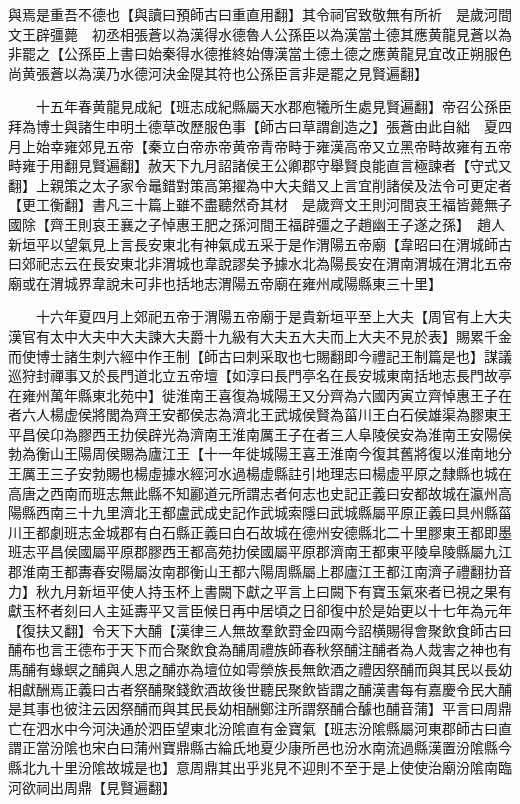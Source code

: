 與焉是重吾不德也【與讀曰預師古曰重直用翻】其令祠官致敬無有所祈　是歲河間文王辟彊薨　初丞相張蒼以為漢得水德魯人公孫臣以為漢當土德其應黄龍見蒼以為非罷之【公孫臣上書曰始秦得水德推終始傳漢當土德土德之應黄龍見宜改正朔服色尚黄張蒼以為漢乃水德河決金隄其符也公孫臣言非是罷之見賢遍翻】

　　十五年春黄龍見成紀【班志成紀縣屬天水郡庖犧所生處見賢遍翻】帝召公孫臣拜為博士與諸生申明土德草改歷服色事【師古曰草謂創造之】張蒼由此自絀　夏四月上始幸雍郊見五帝【秦立白帝赤帝黄帝青帝畤于雍漢高帝又立黑帝畤故雍有五帝畤雍于用翻見賢遍翻】赦天下九月詔諸侯王公卿郡守舉賢良能直言極諫者【守式又翻】上親策之太子家令鼂錯對策高第擢為中大夫錯又上言宜削諸侯及法令可更定者【更工衡翻】書凡三十篇上雖不盡聽然奇其材　是歲齊文王則河間哀王福皆薨無子國除【齊王則哀王襄之子悼惠王肥之孫河間王福辟彊之子趙幽王子遂之孫】　趙人新垣平以望氣見上言長安東北有神氣成五采于是作渭陽五帝廟【韋昭曰在渭城師古曰郊祀志云在長安東北非渭城也韋說謬矣予據水北為陽長安在渭南渭城在渭北五帝廟或在渭城界韋說未可非也括地志渭陽五帝廟在雍州咸陽縣東三十里】

　　十六年夏四月上郊祀五帝于渭陽五帝廟于是貴新垣平至上大夫【周官有上大夫漢官有太中大夫中大夫諫大夫爵十九級有大夫五大夫而上大夫不見於表】賜累千金而使博士諸生刺六經中作王制【師古曰刺采取也七賜翻即今禮記王制篇是也】謀議巡狩封禪事又於長門道北立五帝壇【如淳曰長門亭名在長安城東南括地志長門故亭在雍州萬年縣東北苑中】徙淮南王喜復為城陽王又分齊為六國丙寅立齊悼惠王子在者六人楊虚侯將閭為齊王安都侯志為濟北王武城侯賢為菑川王白石侯雄渠為膠東王平昌侯卬為膠西王扐侯辟光為濟南王淮南厲王子在者三人阜陵侯安為淮南王安陽侯勃為衡山王陽周侯賜為廬江王【十一年徙城陽王喜王淮南今復其舊將復以淮南地分王厲王三子安勃賜也楊虛據水經河水過楊虚縣註引地理志曰楊虚平原之隸縣也城在高唐之西南而班志無此縣不知酈道元所謂志者何志也史記正義曰安都故城在瀛州高陽縣西南三十九里濟北王都盧武成史記作武城索隱曰武城縣屬平原正義曰具州縣菑川王都劇班志金城郡有白石縣正義曰白石故城在德州安德縣北二十里膠東王都即墨班志平昌侯國屬平原郡膠西王都高苑扐侯國屬平原郡濟南王都東平陵阜陵縣屬九江郡淮南王都夀春安陽屬汝南郡衡山王都六陽周縣屬上郡廬江王都江南濟子禮翻扐音力】秋九月新垣平使人持玉杯上書闕下獻之平言上曰闕下有寶玉氣來者已視之果有獻玉杯者刻曰人主延夀平又言臣候日再中居頃之日卻復中於是始更以十七年為元年【復扶又翻】令天下大酺【漢律三人無故羣飲罸金四兩今詔横賜得會聚飲食師古曰酺布也言王德布于天下而合聚飲食為酺周禮族師春秋祭酺注酺者為人烖害之神也有馬酺有蝝螟之酺與人思之酺亦為壇位如雩禜族長無飲酒之禮因祭酺而與其民以長幼相獻酬焉正義曰古者祭酺聚錢飲酒故後世聽民聚飲皆謂之酺漢書每有嘉慶令民大酺是其事也彼注云因祭酺而與其民長幼相酬鄭注所謂祭酺合醵也酺音蒲】平言曰周鼎亡在泗水中今河決通於泗臣望東北汾隂直有金寶氣【班志汾隂縣屬河東郡師古曰直謂正當汾隂也宋白曰蒲州寶鼎縣古綸氏地夏少康所邑也汾水南流過縣漢置汾隂縣今縣北九十里汾隂故城是也】意周鼎其出乎兆見不迎則不至于是上使使治廟汾隂南臨河欲祠出周鼎【見賢遍翻】

